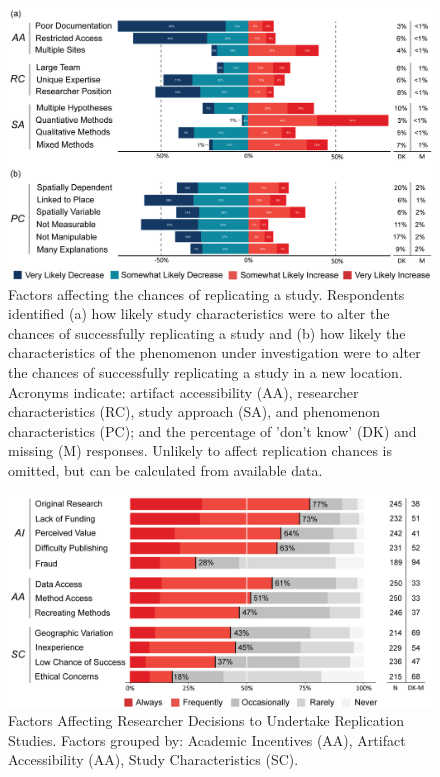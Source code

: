 \documentclass[]{interact}
\theoremstyle{plain}%
\theoremstyle{definition}
\theoremstyle{remark}
\begin{document}
\newpage

\begin{figure}[hbt!]
    \centering
    \includegraphics[scale=0.8]{results/figures/Fig-Q8-10-Chances.png}
    \caption{Factors affecting the chances of replicating a study. Respondents identified (a) how likely study characteristics were to alter the chances of successfully replicating a study and (b) how likely the characteristics of the phenomenon under investigation were to alter the chances of successfully replicating a study in a new location. Acronyms indicate: artifact accessibility (AA), researcher characteristics (RC), study approach (SA), and phenomenon characteristics (PC); and the percentage of 'don't know' (DK) and missing (M) responses. Unlikely to affect replication chances is omitted, but can be calculated from available data.}
    \label{fig:Q8-10-Chances}
\end{figure}

\newpage

\begin{figure}[hbt!]
    \centering
    \includegraphics[scale=0.80]{results/figures/Fig-Q15-Decisions.png}
    \caption{Factors Affecting Researcher Decisions to Undertake Replication Studies. Factors grouped by: Academic Incentives (AA), Artifact Accessibility (AA), Study Characteristics (SC).}
    \label{fig:Q15-DecisionFactors}
\end{figure}
\end{document}
